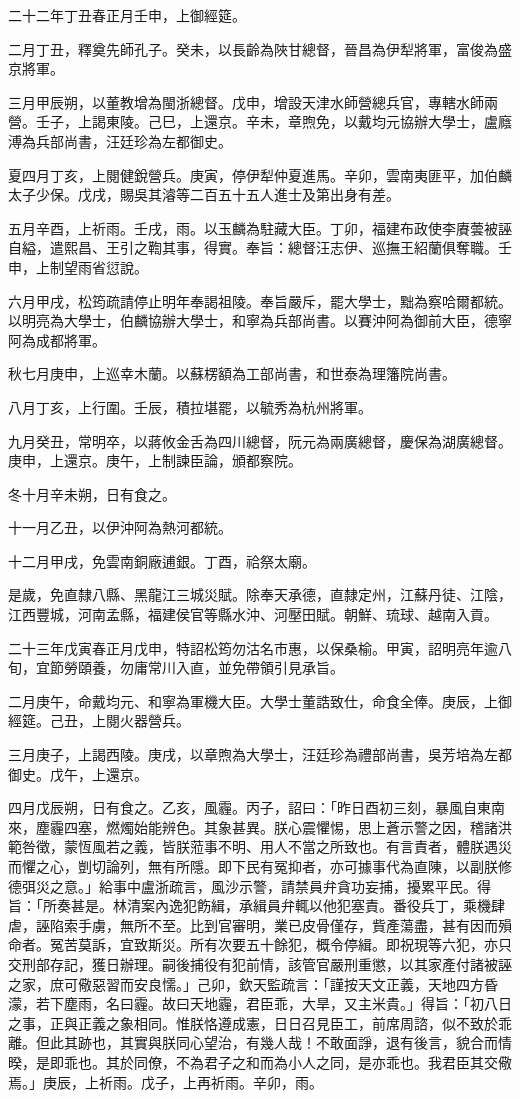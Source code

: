 \begin{pinyinscope}
二十二年丁丑春正月壬申，上御經筵。

二月丁丑，釋奠先師孔子。癸未，以長齡為陜甘總督，晉昌為伊犁將軍，富俊為盛京將軍。

三月甲辰朔，以董教增為閩浙總督。戊申，增設天津水師營總兵官，專轄水師兩營。壬子，上謁東陵。己巳，上還京。辛未，章煦免，以戴均元協辦大學士，盧廕溥為兵部尚書，汪廷珍為左都御史。

夏四月丁亥，上閱健銳營兵。庚寅，停伊犁仲夏進馬。辛卯，雲南夷匪平，加伯麟太子少保。戊戌，賜吳其濬等二百五十五人進士及第出身有差。

五月辛酉，上祈雨。壬戌，雨。以玉麟為駐藏大臣。丁卯，福建布政使李賡蕓被誣自縊，遣熙昌、王引之鞫其事，得實。奉旨：總督汪志伊、巡撫王紹蘭俱奪職。壬申，上制望雨省愆說。

六月甲戌，松筠疏請停止明年奉謁祖陵。奉旨嚴斥，罷大學士，黜為察哈爾都統。以明亮為大學士，伯麟協辦大學士，和寧為兵部尚書。以賽沖阿為御前大臣，德寧阿為成都將軍。

秋七月庚申，上巡幸木蘭。以蘇楞額為工部尚書，和世泰為理籓院尚書。

八月丁亥，上行圍。壬辰，積拉堪罷，以毓秀為杭州將軍。

九月癸丑，常明卒，以蔣攸金舌為四川總督，阮元為兩廣總督，慶保為湖廣總督。庚申，上還京。庚午，上制諫臣論，頒都察院。

冬十月辛未朔，日有食之。

十一月乙丑，以伊沖阿為熱河都統。

十二月甲戌，免雲南銅廠逋銀。丁酉，祫祭太廟。

是歲，免直隸八縣、黑龍江三城災賦。除奉天承德，直隸定州，江蘇丹徒、江陰，江西豐城，河南孟縣，福建侯官等縣水沖、河壓田賦。朝鮮、琉球、越南入貢。

二十三年戊寅春正月戊申，特詔松筠勿沽名市惠，以保桑榆。甲寅，詔明亮年逾八旬，宜節勞頤養，勿庸常川入直，並免帶領引見承旨。

二月庚午，命戴均元、和寧為軍機大臣。大學士董誥致仕，命食全俸。庚辰，上御經筵。己丑，上閱火器營兵。

三月庚子，上謁西陵。庚戌，以章煦為大學士，汪廷珍為禮部尚書，吳芳培為左都御史。戊午，上還京。

四月戊辰朔，日有食之。乙亥，風霾。丙子，詔曰：「昨日酉初三刻，暴風自東南來，塵霾四塞，燃燭始能辨色。其象甚異。朕心震懼惕，思上蒼示警之因，稽諸洪範咎徵，蒙恆風若之義，皆朕蒞事不明、用人不當之所致也。有言責者，體朕遇災而懼之心，剴切論列，無有所隱。即下民有冤抑者，亦可據事代為直陳，以副朕修德弭災之意。」給事中盧浙疏言，風沙示警，請禁員弁貪功妄捕，擾累平民。得旨：「所奏甚是。林清案內逸犯飭緝，承緝員弁輒以他犯塞責。番役兵丁，乘機肆虐，誣陷索手虜，無所不至。比到官審明，業已皮骨僅存，貲產蕩盡，甚有因而殞命者。冤苦莫訴，宜致斯災。所有次要五十餘犯，概令停緝。即祝現等六犯，亦只交刑部存記，獲日辦理。嗣後捕役有犯前情，該管官嚴刑重懲，以其家產付諸被誣之家，庶可儆惡習而安良懦。」己卯，欽天監疏言：「謹按天文正義，天地四方昏濛，若下塵雨，名曰霾。故曰天地霾，君臣乖，大旱，又主米貴。」得旨：「初八日之事，正與正義之象相同。惟朕恪遵成憲，日日召見臣工，前席周諮，似不致於乖離。但此其跡也，其實與朕同心望治，有幾人哉！不敢面諍，退有後言，貌合而情暌，是即乖也。其於同僚，不為君子之和而為小人之同，是亦乖也。我君臣其交儆焉。」庚辰，上祈雨。戊子，上再祈雨。辛卯，雨。


\end{pinyinscope}
